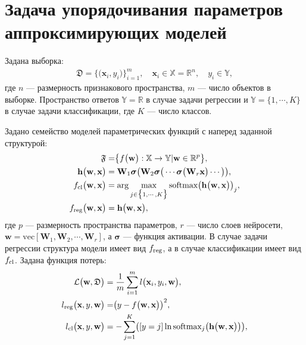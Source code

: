 \section{Задача упорядочивания параметров аппроксимирующих моделей}
Задана выборка:
\[
\label{eq:st:1}
\begin{aligned}
\mathfrak{D} = \bigr\{\bigr(\textbf{x}_i, y_i\bigr)\bigr\}_{i=1}^{m}, \quad \textbf{x}_{i} \in \mathbb{X} = \mathbb{R}^{n}, \quad y_i \in \mathbb{Y},
\end{aligned}
\]
где $n$ --- размерность признакового пространства, $m$ --- число объектов в выборке. Пространство ответов $\mathbb{Y} = \mathbb{R}$ в случае задачи регрессии и  $\mathbb{Y} = \{1,\cdots, K\}$ в случае задачи классификации, где $K$ --- число классов.

Задано семейство моделей параметрических функций с наперед заданной структурой:
\[
\label{eq:st:2}
\begin{aligned}
\mathfrak{F} &= \bigr\{f\bigr(\textbf{w}\bigr):\mathbb{X} \to \mathbb{Y} | \textbf{w} \in \mathbb{R}^{p}\bigr\}, \\ 
\mathbf{h}\bigr(\textbf{w}, \textbf{x}\bigr) &= \textbf{W}_1\bm{\sigma}\bigr(\textbf{W}_2\bm{\sigma}\bigr(\cdots\bm{\sigma}\bigr(\textbf{W}_r\textbf{x}\bigr)\cdots\bigr)\bigr),\\
f_{\text{\text{cl}}}\bigr(\textbf{w}, \textbf{x}\bigr) &= \arg \max_{j \in \bigr\{1,\cdots, K\bigr\}} \text{softmax}\bigr(\mathbf{h}\bigr(\textbf{w}, \textbf{x}\bigr)\bigr)_{j}, \\ 
f_{\text{reg}}\bigr(\textbf{w}, \textbf{x}\bigr) & = \mathbf{h}\bigr(\textbf{w}, \textbf{x}\bigr), 
\end{aligned}
\]
где $p$ --- размерность пространства параметров, $r$ --- число слоев нейросети, $\textbf{w} = \text{vec}[\textbf{W}_1, \textbf{W}_2, \cdots, \textbf{W}_r]$, а $\bm{\sigma}$ --- функция активации. В случае задачи регрессии структура модели имеет вид $f_{\text{\text{reg}}}$, а в случае классификации имеет вид $f_{\text{\text{cl}}}$.
Задана функция потерь:
\[
\label{eq:st:3}
\begin{aligned}
\mathcal{L}\bigr(\textbf{w}, \mathfrak{D}\bigr) &= \frac{1}{m}\sum_{i=1}^{m}l\bigr(\textbf{x}_{i}, y_i, \textbf{w}\bigr),\\
l_{\text{\text{reg}}}\bigr(\textbf{x}, y, \textbf{w}\bigr) &= \bigr(y - f\bigr(\textbf{w}, \textbf{x}\bigr)\bigr)^{2},\\
l_{\text{\text{cl}}}\bigr(\textbf{x}, y, \textbf{w}\bigr) &= -\sum_{j=1}^{K}\bigr([y = j]\ln\text{softmax}_j\bigr(\mathbf{h}\bigr(\textbf{w}, \textbf{x}\bigr)\bigr)\bigr),
\end{aligned}
\]

